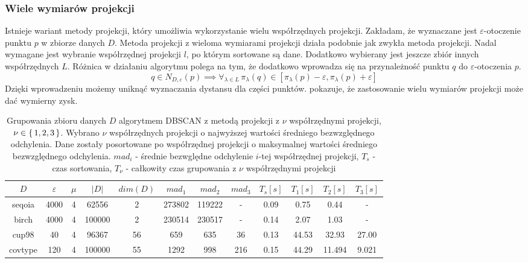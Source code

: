 \subsubsection{Wiele wymiarów projekcji}
Istnieje wariant metody projekcji, który umożliwia wykorzystanie wielu współrzędnych projekcji. Zakładam, że wyznaczane jest $ \varepsilon $-otoczenie punktu $ p $ w zbiorze danych $ D $. Metoda projekcji z wieloma wymiarami projekcji działa podobnie jak zwykła metoda projekcji. Nadal wymagane jest wybranie współrzędnej projekcji $ l $, po którym sortowane są dane. Dodatkowo wybierany jest jeszcze zbiór innych współrzędnych $ L $. Różnica w działaniu algorytmu polega na tym, że dodatkowo wprowadza się  na przynależność punktu $ q $ do $ \varepsilon $-otoczenia $ p $.
\begin{equation}\label{eq:projection-mult}
	q \in N_{D,\varepsilon}(p) \implies  \forall_{\lambda\in L}\,\pi_\lambda(q) \in \left[\pi_\lambda(p)-\varepsilon,\pi_\lambda(p)+\varepsilon\right] 
\end{equation}
Dzięki wprowadzeniu  możemy uniknąć wyznaczania dystansu dla części punktów.  pokazuje, że zastosowanie wielu wymiarów projekcji może dać wymierny zysk.

\begin{table}[H] 
	\footnotesize
	\tabcolsep=0.11cm
	\centering
	\begin{tabular}{|c|c|c|c|c|c|c|c|c|c|c|c|}
		\hline 
		$D$			&$ \varepsilon $ & $ \mu $ & $|D|$&$dim(D)$& $ mad_1 $&$ mad_2 $&$ mad_3 $&$ T_s[s]$&$ T_1[s] $&$ T_2[s] $&$ T_3[s] $\\\hline
		seqoia	&4000	&4&62556	&2 &273802&119222&-& 0.09 & 0.75  & 0.44 		& -		\\\hline
		birch		&4000	&4&100000	&2 &230514&230517&-& 0.14 & 2.07  & 1.03		& -		\\\hline
		cup98		&40		&4&96367	&56&659&635&36& 0.13 & 44.53 & 32.93		& 27.00		\\\hline
		covtype	&120	&4&100000	&55&1292&998&216& 0.15 & 44.29 & 11.494	& 9.021	\\\hline
	\end{tabular}
	\caption{Grupowania zbioru danych $ D $ algorytmem DBSCAN z metodą projekcji z $ \nu $ współrzędnymi projekcji, $ \nu \in \set{1,2,3} $. Wybrano $ \nu $ współrzędnych projekcji o najwyższej wartości średniego bezwzględnego odchylenia. Dane zostały posortowane po współrzędnej projekcji o maksymalnej wartości średniego bezwzględnego odchylenia. $ mad_i $ - średnie bezwględne odchylenie $ i $-tej współrzędnej projekcji, $ T_s $ - czas sortowania, $ T_\nu $ - całkowity czas grupowania z $ \nu $ współrzędnymi projekcji}\label{tbl:projection-time-by-nu}
\end{table}

